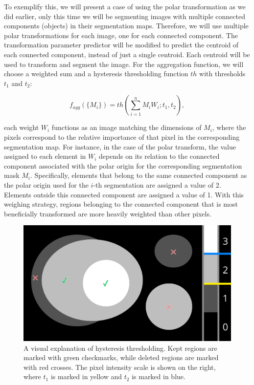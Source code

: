 To exemplify this, we will present a case of using the polar transformation as we did earlier, only this time we will be segmenting images with multiple connected components (objects) in their segmentation maps. Therefore, we will use multiple polar transformations for each image, one for each connected component. The transformation parameter predictor will be modified to predict the centroid of each connected component, instead of just a single centroid. Each centroid will be used to transform and segment the image. For the aggregation function, we will choose a weighted sum and a hysteresis thresholding function $th$ with thresholds $t_1$ and $t_2$:

\begin{equation}
	f_{agg}(\{M_i\}) = th(\sum_{i = 1}^n M_i W_i; t_1, t_2),
\end{equation}

each weight \(W_i\) functions as an image matching the dimensions of \(M_i\), where the pixels correspond to the relative importance of that pixel in the corresponding segmentation map. For instance, in the case of the polar transform, the value assigned to each element in \(W_i\) depends on its relation to the connected component associated with the polar origin for the corresponding segmentation mask \(M_i\). Specifically, elements that belong to the same connected component as the polar origin used for the \(i\)-th segmentation are assigned a value of 2. Elements outside this connected component are assigned a value of 1. With this weighing strategy, regions belonging to the connected component that is most beneficially transformed are more heavily weighted than other pixels.

		\begin{figure}[h]
		\centering
		\includegraphics[width=0.5\linewidth]{images/4/hysteresis-ccs}
		\caption{A visual explanation of hysteresis thresholding. Kept regions are marked with green checkmarks, while deleted regions are marked with red crosses. The pixel intensity scale is shown on the right, where $t_1$ is marked in yellow and $t_2$ is marked in blue.}
		\label{fig:hysteresis-ccs}
	\end{figure}

